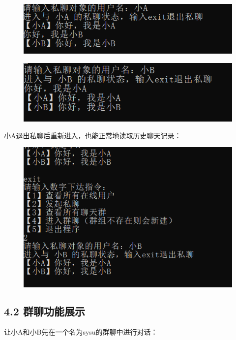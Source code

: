 \documentclass{report}
\begin{document}
\begin{figure}[h]\centering
\includegraphics[scale=0.3]{pic/5.png}
\end{figure}
\begin{figure}[h]\centering
\includegraphics[scale=0.3]{pic/6.png}
\end{figure}
小A退出私聊后重新进入，也能正常地读取历史聊天记录：

\begin{figure}[H]\centering
\includegraphics[scale=0.3]{pic/7.png}
\end{figure}
 
 \subsection*{4.2 群聊功能展示}
让小A和小B先在一个名为sysu的群聊中进行对话：
\end{document}
